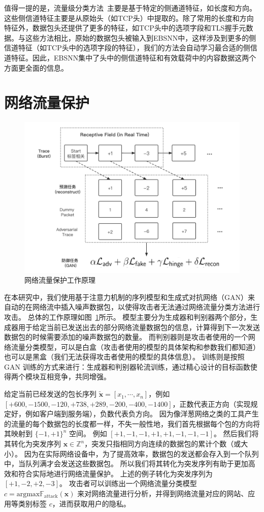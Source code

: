 \documentclass[degree=master,cjk-font=noto]{thuthesis}
\begin{document}
值得一提的是，流量级分类方法~\cite{b12, MAAF}主要是基于特定的侧通道特征，如长度和方向。这些侧信道特征主要是从原始头（如TCP头）中提取的。除了常用的长度和方向特征外，数据包头还提供了更多的特征，如TCP头中的选项字段和TLS握手元数据。与这些方法相比，原始的数据包头被输入到EBSNN中，这样涉及到更多的侧信道特征（如TCP头中的选项字段的特征），我们的方法会自动学习最合适的侧信道特征。因此，EBSNN集中了头中的侧信道特征和有效载荷中的内容数据这两个方面更全面的信息。

\section{网络流量保护}

\begin{figure}[!tp]
	\centerline{\includegraphics[width=12cm]{Practicable WF Defense.png}}
	\caption{网络流量保护工作原理}
	\label{fig:flow_defense}
\end{figure}

在本研究中，我们使用基于注意力机制的序列模型和生成式对抗网络（GAN）来自动的在网络流中插入噪声数据包，以使得攻击者无法通过网络流量分类方法进行攻击。
总体的工作原理如图~\ref{fig:flow_defense}所示。
模型主要分为生成器和判别器两个部分，生成器用于给定当前已发送出去的部分网络流量数据包的信息，计算得到下一次发送数据包的时候需要添加的噪声数据包的数量。
而判别器则是攻击者使用的一个网络流量分类模型，可以是白盒（攻击者使用的模型的具体架构和参数我们都知道）也可以是黑盒（我们无法获得攻击者使用的模型的具体信息）。
训练则是按照 GAN 训练的方式来进行：生成器和判别器轮流训练，通过精心设计的目标函数使得两个模块互相竞争，共同增强。

给定当前已经发送的包长序列 $\tilde{\boldsymbol{x}} = [x_1, \cdots, x_n]$，例如 $[+600, -1500, -120, +738, +289, -200, -400, -1400]$，正数代表正方向（实现规定好，例如客户端到服务端），负数代表负方向。
因为像洋葱网络之类的工具产生的流量的每个数据包的长度都一样，不失一般性地，我们首先根据每个包的方向将其映射到 $\{-1, +1\}^n$ 空间。
例如 $[+1, -1, -1, +1, +1, -1, -1, -1]$。
然后我们将其转化为突发序列 $\boldsymbol{x} \in \mathbb{Z}^n$，突发只指相同方向连续的数据包的累计个数（或大小）。
因为在实际网络设备中，为了提高效率，数据包的发送都会存入到一个队列中，当队列满才会发送这些数据包。
所以我们将其转化为突发序列有助于更加高效和符合实际地进行网络流量保护。
上述的例子转化为突发序列为 $[+1, -2, +2, -3]$。
攻击者可以训练出一个网络流量分类模型 $c = \text{argmax} \mathbb{F}_{\text{attack}} (\boldsymbol{x})$ 来对网络流量进行分析，并得到网络流量对应的网站、应用等类别标签 $c$，进而获取用户的隐私。
\end{document}
